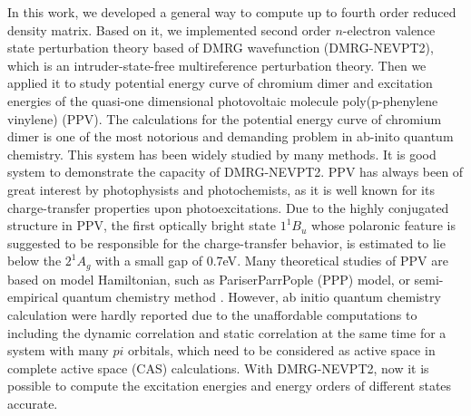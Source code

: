 In this work, we developed a general way to compute up to fourth order reduced density matrix. Based on it, 
we implemented second order $n$-electron valence state perturbation theory based of DMRG wavefunction (DMRG-NEVPT2), which is an intruder-state-free multireference perturbation theory.
Then we applied it to study potential energy curve of chromium dimer and excitation energies of the quasi-one dimensional  photovoltaic molecule poly(p-phenylene vinylene) (PPV). 
The calculations for the potential energy curve of chromium dimer is one of the most notorious and demanding problem in ab-inito quantum chemistry. This system has been widely studied by many methods\cite{roos_ground_2003,celani_cipt2_2004,angeli_third-order_2006,muller_large-scale_2009,kurashige_second-order_2011,ruiperez_complete_2011,kurashige_multireference_2014,sharma_multireference_2015}. It is good system to demonstrate the capacity of DMRG-NEVPT2. 
PPV has always been of great interest by photophysists and photochemists, as it is well known for its charge-transfer properties upon photoexcitations\cite{burroughes_light-emitting_1990,friend_electroluminescence_1999}. Due 
to the highly conjugated structure in PPV, the first optically bright state $1^{1}B_{u}$ whose polaronic feature is suggested to be 
responsible for the charge-transfer behavior, is estimated to lie below the $2^{1}A_{g}$ with a small gap of 0.7eV\cite{martin_linear_1999}. 
Many theoretical studies of PPV are based on model Hamiltonian, such as  Pariser\textendash Parr\textendash Pople (PPP) model, \cite{shukla_correlated_2002}\cite{bursill_symmetry-adapted_2009} or semi-empirical quantum chemistry method \cite{beljonne_theoretical_1995}. However, ab initio quantum chemistry calculation were hardly reported due to the unaffordable computations to including the dynamic correlation and static correlation at the same time for a system with many $pi$ orbitals, which need to be considered as active space in complete active space (CAS) calculations.
With DMRG-NEVPT2, now it is possible to compute the excitation energies and energy orders of different states accurate.

